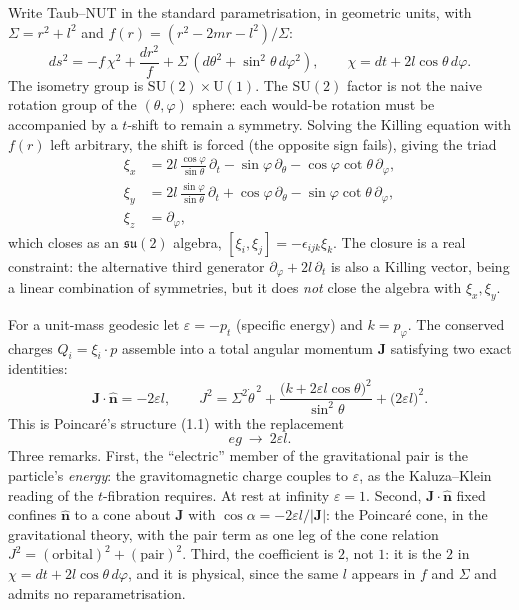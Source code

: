 \documentclass[11pt]{article}
\numberwithin{equation}{section}
\newcommand{\eps}{\varepsilon}
\begin{document}
Write Taub--NUT in the standard parametrisation, in geometric units, with
$\Sigma=r^2+l^2$ and $f(r)=(r^2-2mr-l^2)/\Sigma$:
\begin{equation}
ds^2=-f\,\chi^2+\frac{dr^2}{f}+\Sigma\,(d\theta^2+\sin^2\theta\,d\varphi^2),
\qquad
\chi=dt+2l\cos\theta\,d\varphi .
\end{equation}
The isometry group is $\mathrm{SU}(2)\times\mathrm{U}(1)$. The
$\mathrm{SU}(2)$ factor is not the naive rotation group of the
$(\theta,\varphi)$ sphere: each would-be rotation must be accompanied by a
$t$-shift to remain a symmetry. Solving the Killing equation with $f(r)$
left arbitrary, the shift is forced (the opposite sign fails), giving the
triad
\begin{align}
\xi_x&=2l\,\frac{\cos\varphi}{\sin\theta}\,\partial_t
-\sin\varphi\,\partial_\theta-\cos\varphi\cot\theta\,\partial_\varphi,\\
\xi_y&=2l\,\frac{\sin\varphi}{\sin\theta}\,\partial_t
+\cos\varphi\,\partial_\theta-\sin\varphi\cot\theta\,\partial_\varphi,\\
\xi_z&=\partial_\varphi ,
\end{align}
which closes as an $\mathfrak{su}(2)$ algebra,
$[\xi_i,\xi_j]=-\epsilon_{ijk}\xi_k$. The closure is a real constraint: the
alternative third generator $\partial_\varphi+2l\,\partial_t$ is also a
Killing vector, being a linear combination of symmetries, but it does
\emph{not} close the algebra with $\xi_x,\xi_y$.

For a unit-mass geodesic let $\eps=-p_t$ (specific energy) and
$k=p_\varphi$. The conserved charges $Q_i=\xi_i\cdot p$ assemble into a
total angular momentum $\mathbf{J}$ satisfying two exact identities:
\begin{equation}
\mathbf{J}\cdot\hat{\mathbf{n}}=-2\eps l,
\qquad
J^2=\Sigma^2\dot\theta^{\,2}
+\frac{\big(k+2\eps l\cos\theta\big)^2}{\sin^2\theta}
+\big(2\eps l\big)^2 .
\end{equation}
This is Poincar\'e's structure (1.1) with the replacement
\begin{equation}
eg\ \longrightarrow\ 2\eps l .
\end{equation}
Three remarks. First, the ``electric'' member of the gravitational pair is
the particle's \emph{energy}: the gravitomagnetic charge couples to $\eps$,
as the Kaluza--Klein reading of the $t$-fibration requires. At rest at
infinity $\eps=1$. Second, $\mathbf{J}\cdot\hat{\mathbf{n}}$ fixed confines
$\hat{\mathbf{n}}$ to a cone about $\mathbf{J}$ with
$\cos\alpha=-2\eps l/|\mathbf{J}|$: the Poincar\'e cone, in the
gravitational theory, with the pair term as one leg of the cone relation
$J^2=(\text{orbital})^2+(\text{pair})^2$. Third, the coefficient is $2$,
not $1$: it is the $2$ in $\chi=dt+2l\cos\theta\,d\varphi$, and it is
physical, since the same $l$ appears in $f$ and $\Sigma$ and admits no
reparametrisation.
\end{document}
